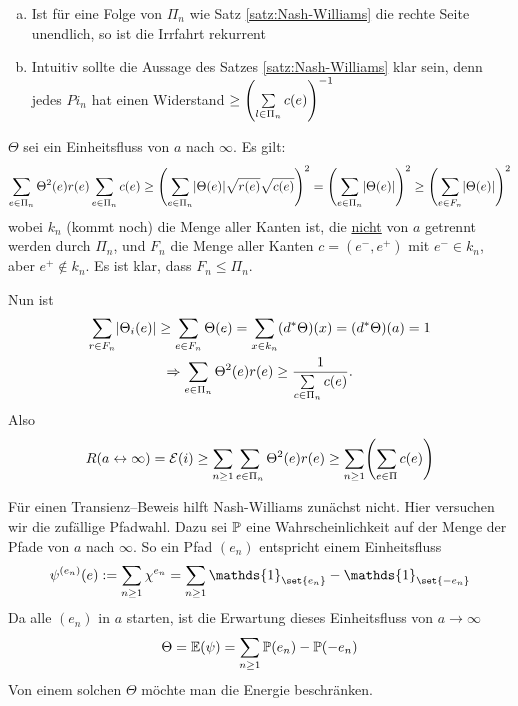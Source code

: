 \begin{bemerkung}
	\begin{enumerate}[a)]
		\item Ist für eine Folge von $\Pi_n$ wie Satz \ref{satz:Nash-Williams} die rechte Seite unendlich, so ist die Irrfahrt rekurrent
		\item Intuitiv sollte die Aussage des Satzes \ref{satz:Nash-Williams} klar sein, denn jedes $Pi_n$ hat einen Widerstand $ \geq \left(\sum\limits_{l\in \Pi_n} c(e)\right)^{-1}$
	\end{enumerate}
\end{bemerkung}
\begin{beweis}
	$\Theta$ sei ein Einheitsfluss von $a$ nach $\infty$. Es gilt:
	\begin{align}
	\sum\limits_{e \in \Pi_n} \Theta^2(e) r(e) \sum\limits_{e \in \Pi_n} c(e) \geq \left(\sum\limits_{e \in \Pi_n}\lvert\Theta(e)\rvert \sqrt{r(e)}\sqrt{c(e)}\right)^2 = \left(\sum\limits_{e \in \Pi_n}\lvert\Theta(e)\rvert\right)^2 \geq \left(\sum\limits_{e \in F_n}\lvert\Theta(e)\rvert \right)^2
	\end{align}
	wobei $k_n$ (kommt noch) die Menge aller Kanten ist, die \underline{nicht} von $a$ getrennt werden durch $\Pi_n$, und $F_n$ die Menge aller Kanten $c = (e^-,e^+)$ mit $e^- \in k_n$, aber $e^+ \notin k_n$. Es ist klar, dass $F_n \leq \Pi_n$.
	
	Nun ist 
	\begin{gather}
	\sum\limits_{r \in F_n} \lvert\Theta_i(e)\rvert \geq \sum\limits_{e \in F_n} \Theta(e) = \sum\limits_{x \in k_n} (d^*\Theta)(x) = (d^*\Theta)(a) = 1 \\
	\Rightarrow \sum\limits_{e \in \Pi_n} \Theta^2(e)r(e) \geq \frac{1}{\sum\limits_{c \in \Pi_n}c(e)}.
	\end{gather}
	Also 
	\begin{align}
	R (a \leftrightarrow \infty) = \mathcal{E}(i) \geq \sum\limits_{n \geq 1}\sum\limits_{e\in \Pi_n} \Theta^2(e)r(e) \geq \sum\limits_{n \geq 1} \enb{\sum\limits_{e \in\Pi} c(e)}
	\end{align}
	
	
\end{beweis}

Für einen Transienz--Beweis hilft Nash-Williams zunächst nicht. Hier versuchen wir die zufällige Pfadwahl. Dazu sei $\mathbb{P}$ eine Wahrscheinlichkeit auf der Menge der Pfade von $a$ nach $\infty$. So ein Pfad $(e_n)$ entspricht einem Einheitsfluss
\begin{gather}
\psi^{(e_n)} (e) := \sum\limits_{n \geq 1} \chi^{e_n} = \sum\limits_{n \geq 1} \mathds{1}_{\set{e_n}}- \mathds{1}_{\set{-e_n}}
\end{gather}
Da alle $(e_n)$ in $a$ starten, ist die Erwartung dieses Einheitsfluss von $a \to \infty$  
\begin{align}
\Theta = \EW{\psi} = \sum\limits_{n \geq 1}\prop{e_n} - \prop{-e_n}
\end{align}
Von einem solchen $\Theta$ möchte man die Energie beschränken. 


